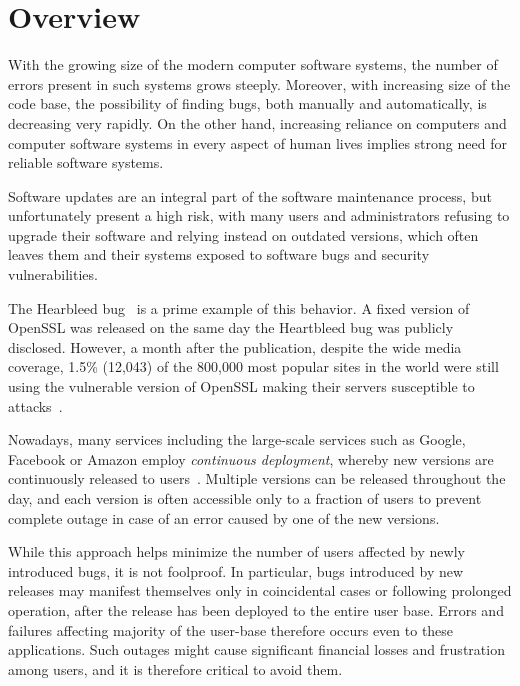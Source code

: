 \chapter{Overview}
\label{chap:overview}

With the growing size of the modern computer software systems, the number of
errors present in such systems grows steeply.  Moreover, with increasing size
of the code base, the possibility of finding bugs, both manually and
automatically, is decreasing very rapidly. On the other hand, increasing
reliance on computers and computer software systems in every aspect of human
lives implies strong need for reliable software systems.

Software updates are an integral part of the software maintenance process, but
unfortunately present a high risk, with many users and administrators refusing
to upgrade their software and relying instead on outdated versions, which often
leaves them and their systems exposed to software bugs and security
vulnerabilities.

The Hearbleed bug~\cite{heartbleed} is a prime example of this behavior. A
fixed version of OpenSSL was released on the same day the Heartbleed bug was
publicly disclosed.  However, a month after the publication, despite the wide
media coverage, 1.5\% (12,043) of the 800,000 most popular sites in the world
were still using the vulnerable version of OpenSSL making their servers
susceptible to attacks~\cite{heartbleed-prevalent}.

Nowadays, many services including the large-scale services such as Google,
Facebook or Amazon employ \emph{continuous deployment}, whereby new versions
are continuously released to users~\cite{johnson2009}. Multiple versions can be
released throughout the day, and each version is often accessible only to a
fraction of users to prevent complete outage in case of an error caused by one
of the new versions.

While this approach helps minimize the number of users affected by newly
introduced bugs, it is not foolproof. In particular, bugs introduced by new
releases may manifest themselves only in coincidental cases or following
prolonged operation, after the release has been deployed to the entire user
base. Errors and failures affecting majority of the user-base therefore occurs
even to these applications. Such outages might cause significant financial
losses and frustration among users, and it is therefore critical to avoid them.

